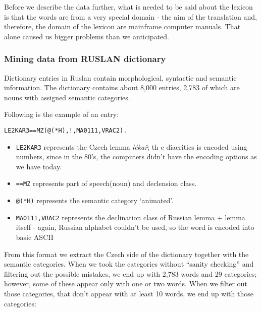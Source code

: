 \documentclass[letterpaper]{article}
\begin{document}
Before we describe the data further, what is needed to be said about the lexicon is 
that the words are from a very special domain - the aim of the translation 
and, therefore, the domain of the lexicon are mainframe computer manuals. 
That alone caused us bigger problems than we anticipated.

\subsubsection{Mining data from RUSLAN dictionary}

Dictionary entries in Ruslan contain morphological,
syntactic and semantic information. The dictionary contains about 8,000 entries, 2,783 of which are nouns
with assigned semantic categories.

Following is the example of an entry:

\begin{verbatim}
LE2KAR3==MZ(@(*H),!,MA0111,VRAC2).
\end{verbatim}

\begin{itemize}
\item \texttt{LE2KAR3} represents the Czech lemma \emph{lékař}; th
e diacritics is encoded using numbers, since in the 80's, the computers didn't have the encoding options as we have today.
\item \texttt{==MZ} represents part of speech(noun) and declension class.
\item \texttt{@(*H)} represents the semantic category `animated'.
\item \texttt{MA0111,VRAC2} represents the declination class of Russian lemma + lemma itself - 
again, Russian alphabet couldn't be used, so the word is encoded into basic ASCII
\end{itemize}

From this format we extract the Czech side of the dictionary together with the semantic categories. 
When we took the categories without ``sanity checking'' and filtering out the possible mistakes, 
we end up with 2,783 words and 29 categories; however, some of these appear only with one or two words. 
When we filter out those categories, that don't appear with at least 10 words, we end up with those categories:
\end{document}
